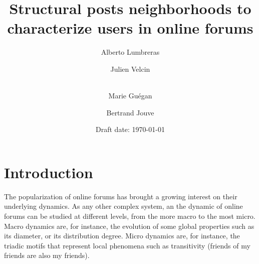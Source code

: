 \documentclass[smallextended]{svjour3}          %
\begin{document}
\title{Structural posts neighborhoods to characterize users in online forums}

\author{Alberto Lumbreras \and
        Julien Velcin  \and\\
        Marie Guégan \and
        Bertrand Jouve
}


\date{Draft date: \today}

\maketitle

\section{Introduction}\label{sec:introduction}

The popularization of online forums has brought a growing interest on their underlying dynamics. As any other complex system, an the dynamic of online forums can be studied at different levels, from the more macro to the most micro. Macro dynamics are, for instance, the evolution of some global properties such as its diameter, or its distribution degree. Micro dynamics are, for instance, the triadic motifs that represent local phenomena such as transitivity (friends of my friends are also my friends).
\end{document}
